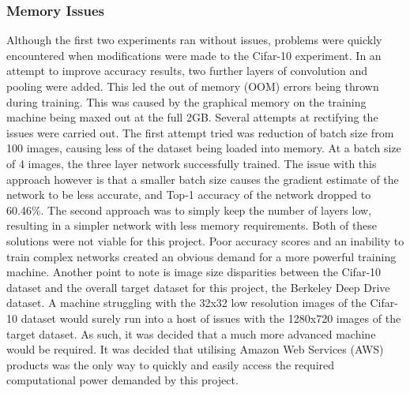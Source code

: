 \documentclass[12pt]{report}
\begin{document}
\subsubsection{Memory Issues}
\begin{flushleft}
Although the first two experiments ran without issues, problems were quickly encountered when modifications were made to the Cifar-10 experiment. In an attempt to improve accuracy results, two further layers of convolution and pooling were added. This led the out of memory (OOM) errors being thrown during training. This was caused by the graphical memory on the training machine being maxed out at the full 2GB. Several attempts at rectifying the issues were carried out. The first attempt tried was reduction of batch size from 100 images, causing less of the dataset being loaded into memory. At a batch size of 4 images, the three layer network successfully trained. The issue with this approach however is that a smaller batch size causes the gradient estimate of the network to be less accurate, and Top-1 accuracy of the network dropped to 60.46\%. The second approach was to simply keep the number of layers low, resulting in a simpler network with less memory requirements. Both of these solutions were not viable for this project. Poor accuracy scores and an inability to train complex networks created an obvious demand for a more powerful training machine. Another point to note is image size disparities between the Cifar-10 dataset and the overall target dataset for this project, the Berkeley Deep Drive dataset. A machine struggling with the 32x32 low resolution images of the Cifar-10 dataset would surely run into a host of issues with the 1280x720 images of the target dataset. As such, it was decided that a much more advanced machine would be required. It was decided that utilising Amazon Web Services (AWS) products was the only way to quickly and easily access the required computational power demanded by this project.
\end{flushleft}
\end{document}
